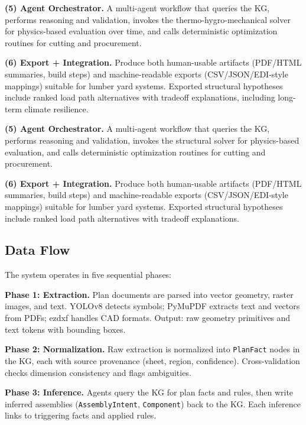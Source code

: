 \textbf{(5) Agent Orchestrator.}
A multi-agent workflow that queries the KG, performs reasoning and validation,
invokes the thermo-hygro-mechanical solver for physics-based evaluation over time,
and calls deterministic optimization routines for cutting and procurement.

\textbf{(6) Export + Integration.}
Produce both human-usable artifacts (PDF/HTML summaries, build steps)
and machine-readable exports (CSV/JSON/EDI-style mappings) suitable for lumber yard systems.
Exported structural hypotheses include ranked load path alternatives with tradeoff explanations, including long-term climate resilience.

\textbf{(5) Agent Orchestrator.}
A multi-agent workflow that queries the KG, performs reasoning and validation,
invokes the structural solver for physics-based evaluation,
and calls deterministic optimization routines for cutting and procurement.

\textbf{(6) Export + Integration.}
Produce both human-usable artifacts (PDF/HTML summaries, build steps)
and machine-readable exports (CSV/JSON/EDI-style mappings) suitable for lumber yard systems.
Exported structural hypotheses include ranked load path alternatives with tradeoff explanations.

\subsection{Data Flow}

The system operates in five sequential phases:

\textbf{Phase 1: Extraction.}
Plan documents are parsed into vector geometry, raster images, and text.
YOLOv8 detects symbols; PyMuPDF extracts text and vectors from PDFs; ezdxf handles CAD formats.
Output: raw geometry primitives and text tokens with bounding boxes.

\textbf{Phase 2: Normalization.}
Raw extraction is normalized into \texttt{PlanFact} nodes in the KG, each with source provenance (sheet, region, confidence).
Cross-validation checks dimension consistency and flags ambiguities.

\textbf{Phase 3: Inference.}
Agents query the KG for plan facts and rules, then write inferred assemblies (\texttt{AssemblyIntent}, \texttt{Component}) back to the KG.
Each inference links to triggering facts and applied rules.

